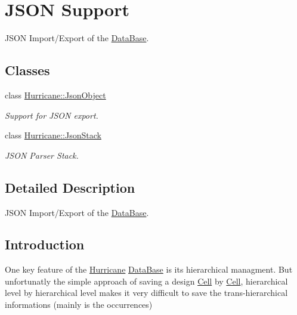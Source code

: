 \hypertarget{group__JsonSupport}{}\section{J\+S\+ON Support}
\label{group__JsonSupport}


J\+S\+ON Import/\+Export of the \mbox{\hyperlink{classHurricane_1_1DataBase}{Data\+Base}}.  


\subsection*{Classes}
\begin{DoxyCompactItemize}
\item 
class \mbox{\hyperlink{classHurricane_1_1JsonObject}{Hurricane\+::\+Json\+Object}}
\begin{DoxyCompactList}\small\item\em Support for J\+S\+ON export. \end{DoxyCompactList}\item 
class \mbox{\hyperlink{classHurricane_1_1JsonStack}{Hurricane\+::\+Json\+Stack}}
\begin{DoxyCompactList}\small\item\em J\+S\+ON Parser Stack. \end{DoxyCompactList}\end{DoxyCompactItemize}


\subsection{Detailed Description}
J\+S\+ON Import/\+Export of the \mbox{\hyperlink{classHurricane_1_1DataBase}{Data\+Base}}. 

\hypertarget{group__JsonSupport_secJsonSupportIntro}{}\subsection{Introduction}\label{group__JsonSupport_secJsonSupportIntro}
One key feature of the \mbox{\hyperlink{namespaceHurricane}{Hurricane}} \mbox{\hyperlink{classHurricane_1_1DataBase}{Data\+Base}} is it\textquotesingle{}s hierarchical managment. But unfortunatly the simple approach of saving a design \mbox{\hyperlink{classHurricane_1_1Cell}{Cell}} by \mbox{\hyperlink{classHurricane_1_1Cell}{Cell}}, hierarchical level by hierarchical level makes it very difficult to save the trans-\/hierarchical informations (mainly is the occurrences)

